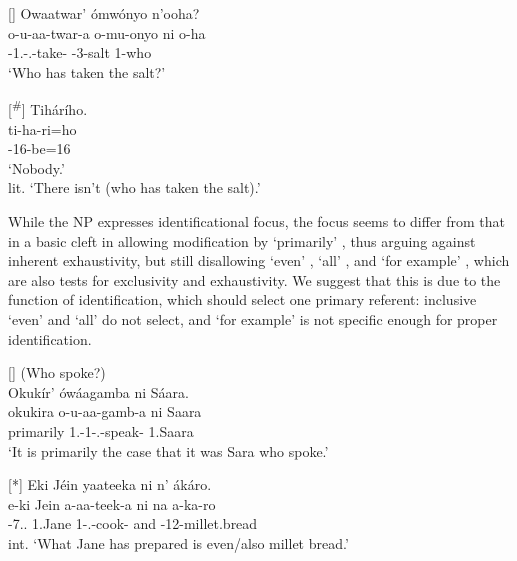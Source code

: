 \documentclass[output=paper]{langscibook}
\begin{document}
\ea
[]{
\label{bkm:Ref98945731}
Owaatwar’ ómwónyo n’ooha? \\
\gll
o-u-aa-twar-a  o-mu-onyo  ni  o-ha\\
\AUG{}-1\SM{}.\REL{}-\N{}.\PST{}-take-\FV{}  \AUG{}-3-salt  \COP{}  1-who\\
\glt
‘Who has taken the salt?’\\
}

\sn
[\textsuperscript{\#}]{
Tihárího.\\
\gll
ti-ha-ri=ho\\
\NEG{}-16\SM{}-be=16\\
\glt
‘Nobody.’\\
lit. ‘There isn’t (who has taken the salt).’\\
}


\z


While the NP expresses identificational focus, the focus seems to differ from that in a basic cleft in allowing modification by ‘primarily’ , thus arguing against inherent exhaustivity, but still disallowing ‘even’ , ‘all’ , and ‘for example’ , which are also tests for exclusivity and exhaustivity. We suggest that this is due to the function of identification, which should select one primary referent: inclusive ‘even’ and ‘all’ do not select, and ‘for example’ is not specific enough for proper identification.

\ea
[]{
\label{bkm:Ref98946942}
(Who spoke?)\\
Okukír’ ówáagamba ni Sáara.\\
\gll
okukira  o-u-aa-gamb-a  ni  Saara\\
primarily  1\SM{}.\REL{}-1\SM{}-\N{}.\PST{}-speak-\FV{}  \COP{}  1.Saara\\
\glt
‘It is primarily the case that it was Sara who spoke.’\\
}

\sn
[*]{
Eki Jéin yaateeka ni n’ ákáro.\\
\gll
e-ki  Jein  a-aa-teek-a  ni  na  a-ka-ro\\
\AUG{}-7.\REL{}.\PRO{}   1.Jane   1\SM{}-\N{}.\PST{}-{}cook-\FV{}  \COP{}  and  \AUG{}-{}12-millet.bread\\
\glt
int. ‘What Jane has prepared is even/also millet bread.’\\
}
\end{document}

